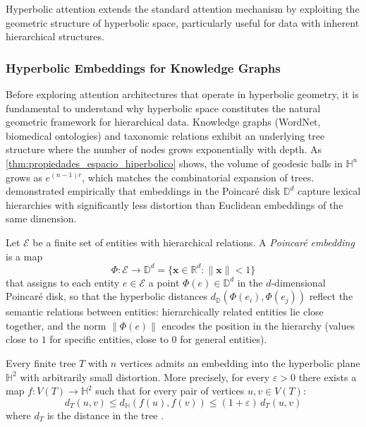 Hyperbolic attention extends the standard attention mechanism by exploiting the geometric structure of hyperbolic space, particularly useful for data with inherent hierarchical structures.

\subsubsection{Hyperbolic Embeddings for Knowledge Graphs}
\label{subsubsec:embeddings_hiperbolicos_grafos}

Before exploring attention architectures that operate in hyperbolic geometry, it is fundamental to understand why hyperbolic space constitutes the natural geometric framework for hierarchical data. Knowledge graphs (WordNet, biomedical ontologies) and taxonomic relations exhibit an underlying tree structure where the number of nodes grows exponentially with depth. As \autoref{thm:propiedades_espacio_hiperbolico} shows, the volume of geodesic balls in $\mathbb{H}^n$ grows as $e^{(n-1)r}$, which matches the combinatorial expansion of trees. \citet{nickel2017poincare} demonstrated empirically that embeddings in the Poincaré disk $\mathbb{D}^d$ capture lexical hierarchies with significantly less distortion than Euclidean embeddings of the same dimension.

\begin{definition}\label{def:embedding_poincare}
Let $\mathcal{E}$ be a finite set of entities with hierarchical relations. A \textit{Poincaré embedding} is a map
\begin{equation}
    \Phi: \mathcal{E} \to \mathbb{D}^d = \{\mathbf{x} \in \mathbb{R}^d : \|\mathbf{x}\| < 1\}
\end{equation}
that assigns to each entity $e \in \mathcal{E}$ a point $\Phi(e) \in \mathbb{D}^d$ in the $d$-dimensional Poincaré disk, so that the hyperbolic distances $d_{\mathbb{D}}(\Phi(e_i), \Phi(e_j))$ reflect the semantic relations between entities: hierarchically related entities lie close together, and the norm $\|\Phi(e)\|$ encodes the position in the hierarchy (values close to $1$ for specific entities, close to $0$ for general entities).
\end{definition}

\begin{theorem}\label{thm:embedding_arboles_hiperbolico}
Every finite tree $T$ with $n$ vertices admits an embedding into the hyperbolic plane $\mathbb{H}^2$ with arbitrarily small distortion. More precisely, for every $\varepsilon > 0$ there exists a map $f: V(T) \to \mathbb{H}^2$ such that for every pair of vertices $u, v \in V(T)$:
\begin{equation}
    d_T(u,v) \leq d_{\mathbb{H}}(f(u), f(v)) \leq (1+\varepsilon)\, d_T(u,v)
\end{equation}
where $d_T$ is the distance in the tree \citep{sarkar2011low}.
\end{theorem}

